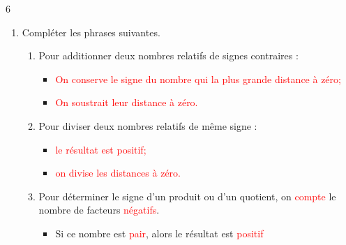 \documentclass[a4paper]{book}
\begin{document}
{\newpage

\setcounter{exo}{1}

            

    \begin{exerciceNote}{6}
        \begin{enumerate}
            \item Compléter les phrases suivantes.
    
            \begin{enumerate}
                \item Pour additionner deux nombres relatifs de signes contraires :
    
                \medskip
            
                \begin{itemize}
                    \item \textcolor{red}{On conserve le signe du nombre qui la plus grande distance à zéro;}
    
                    \medskip
                    
                    \item \textcolor{red}{On soustrait leur distance à zéro.}
                \end{itemize}
    
                \item Pour diviser deux nombres relatifs de même signe :
                
                \medskip
                
                \begin{itemize}
                    \item \textcolor{red}{le résultat est positif;}
    
                    \medskip
                    
                    \item \textcolor{red}{on divise les distances à zéro.}
                \end{itemize}
                
                \item Pour déterminer le signe d'un produit ou d'un quotient, on \textcolor{red}{compte} le nombre de facteurs \textcolor{red}{négatifs}. 
                
                \begin{itemize}
                    \item Si ce nombre est \textcolor{red}{pair}, alors le résultat est \textcolor{red}{positif}
    

\end{itemize}
\end{enumerate}
\end{enumerate}
\end{exerciceNote}}
\end{document}
